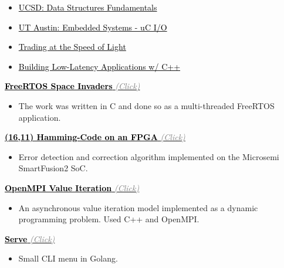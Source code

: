 \documentclass[10pt,a4paper,ragged2e,withhyper]{altacv}
\begin{document}
\begin{paracol}{2}

\divider

\divider

\divider


\begin{itemize}
	\item \href{https://courses.edx.org/certificates/f9250573933e4a3e87e8b28ea989bf99}{{\textcolor{black}{UCSD: Data Structures Fundamentals}}}
	\item \href{https://courses.edx.org/certificates/af6115bce0c646aa95f6aaa6c98acb09}{{\textcolor{black}{UT Austin: Embedded Systems - uC I/O}}}
	\item \href{https://press.princeton.edu/books/hardcover/9780691211381/trading-at-the-speed-of-light}{{\textcolor{black}{Trading at the Speed of Light}}}
	\item \href{https://github.com/PacktPublishing/Building-Low-Latency-Applications-with-CPP?tab=readme-ov-file}{{\textcolor{black}{Building Low-Latency Applications w/ C++ }}}
\end{itemize}



\href{https://github.com/duclos-cavalcanti/FreeRTOS-SpaceInvaders}
     {\textbf{{\textcolor{black}{FreeRTOS Space Invaders}}} \textit{\textcolor{gray}{(Click)}}}
\begin{itemize}
	\item The work was written in C and done so as a multi-threaded FreeRTOS application. 
\end{itemize}

\href{https://github.com/duclos-cavalcanti/microsemi-error-detection}
     {\textbf{{\textcolor{black}{(16,11) Hamming-Code on an FPGA}}} \textit{\textcolor{gray}{(Click)}}}
\begin{itemize}
    \item Error detection and correction algorithm implemented on the Microsemi SmartFusion2 SoC.
\end{itemize}

\href{https://github.com/duclos-cavalcanti/Open-MPI-ValueIteration}
     {\textbf{{\textcolor{black}{OpenMPI Value Iteration}}} \textit{\textcolor{gray}{(Click)}}}
\begin{itemize}
	\item An asynchronous value iteration model implemented as a dynamic programming problem. Used C++ and OpenMPI.
\end{itemize}

\href{https://github.com/duclos-cavalcanti/serve}
     {\textbf{{\textcolor{black}{Serve}}} \textit{\textcolor{gray}{(Click)}}}
\begin{itemize}
	\item Small CLI menu in Golang.
\end{itemize}

\end{paracol}
\end{document}
